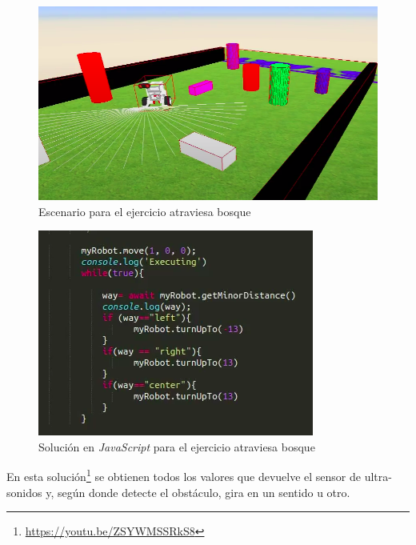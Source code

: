     \begin{figure}[H]
    \centering
    \includegraphics[scale=0.45]{img/forest.png}
    \caption{Escenario para el ejercicio atraviesa bosque} 
    \label{fig:atraviesaBosque}
    \end{figure}

    \begin{figure}[H]
    \centering
    \includegraphics[scale=0.6]{img/solucionforest.png}
    \caption{Solución en \textit{JavaScript} para el ejercicio atraviesa bosque} 
    \label{fig:solucionforest}
    \end{figure}
    
    En esta solución\footnote{\url{https://youtu.be/ZSYWMSSRkS8}} se obtienen todos los valores que devuelve el sensor de ultra-sonidos y, según donde detecte el obstáculo, gira en un sentido u otro.


